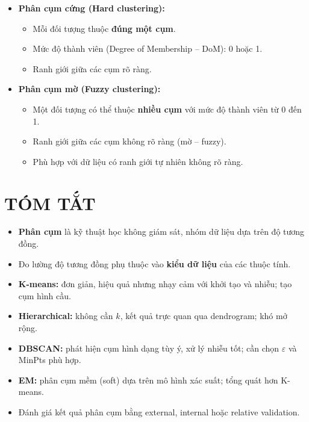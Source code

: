 \documentclass[10pt]{article}
\begin{document}
\begin{itemize}
    \item \textbf{Phân cụm cứng (Hard clustering):}
    \begin{itemize}
        \item Mỗi đối tượng thuộc \textbf{đúng một cụm}.
        \item Mức độ thành viên (Degree of Membership -- DoM): 0 hoặc 1.
        \item Ranh giới giữa các cụm rõ ràng.
    \end{itemize}
    \item \textbf{Phân cụm mờ (Fuzzy clustering):}
    \begin{itemize}
        \item Một đối tượng có thể thuộc \textbf{nhiều cụm} với mức độ thành viên từ 0 đến 1.
        \item Ranh giới giữa các cụm không rõ ràng (mờ -- fuzzy).
        \item Phù hợp với dữ liệu có ranh giới tự nhiên không rõ ràng.
    \end{itemize}
\end{itemize}

\section{TÓM TẮT}

\begin{itemize}
    \item \textbf{Phân cụm} là kỹ thuật học không giám sát, nhóm dữ liệu dựa trên độ tương đồng.
    \item Đo lường độ tương đồng phụ thuộc vào \textbf{kiểu dữ liệu} của các thuộc tính.
    \item \textbf{K-means:} đơn giản, hiệu quả nhưng nhạy cảm với khởi tạo và nhiễu; tạo cụm hình cầu.
    \item \textbf{Hierarchical:} không cần $k$, kết quả trực quan qua dendrogram; khó mở rộng.
    \item \textbf{DBSCAN:} phát hiện cụm hình dạng tùy ý, xử lý nhiễu tốt; cần chọn $\varepsilon$ và MinPts phù hợp.
    \item \textbf{EM:} phân cụm mềm (soft) dựa trên mô hình xác suất; tổng quát hơn K-means.
    \item Đánh giá kết quả phân cụm bằng external, internal hoặc relative validation.
\end{itemize}
\end{document}
